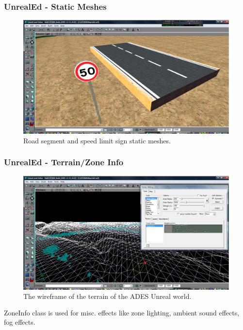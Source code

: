 \documentclass{beamer}
\begin{document}
\begin{frame}
	\frametitle{UnrealEd - Static Meshes}
	\begin{figure}[ht]
	\begin{center}
	\includegraphics[width=.6\paperwidth]{../img/StaticMesh.eps}
	\caption{Road segment and speed limit sign static meshes.}
	\label{fig:StaticMesh}
	\end{center}
	\end{figure}
\end{frame}

\begin{frame}
	\frametitle{UnrealEd - Terrain/Zone Info}
	\begin{figure}[ht]
	\begin{center}
	\includegraphics[width=.6\paperwidth]{../img/Terrain.eps}
	\caption{The wireframe of the terrain of the ADES Unreal world.}
	\label{fig:Terrain}
	\end{center}
	\end{figure}
	\begin{block}{}
		ZoneInfo class is used for misc. effects like zone lighting, ambient sound effects, fog effects.
	\end{block}
\end{frame}
\end{document}
